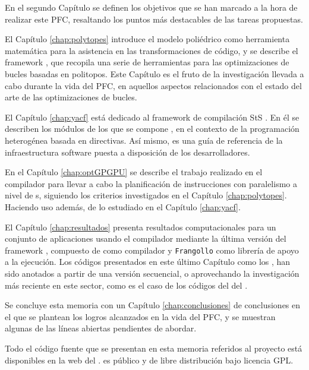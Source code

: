En el segundo Capítulo se definen los objetivos que se han marcado a la hora de realizar este \ac{PFC}, resaltando los puntos más destacables de las tareas propuestas. 

El Capítulo \ref{chap:polytopes} introduce el modelo poliédrico como herramienta 
matemática para la asistencia en las transformaciones de código,
y se describe el framework \pocc{}, que recopila una serie de herramientas para las 
optimizaciones de bucles basadas en politopos. Este Capítulo es el fruto de la 
investigación llevada a cabo durante la vida del \ac{PFC}, en aquellos aspectos  relacionados con el estado del arte de las optimizaciones de bucles.

El Capítulo \ref{chap:yacf} está dedicado al framework de compilación \acf{StS} \yacf{}. 
En él se describen los módulos de los que se compone \yacf{}, en el contexto 
de la programación heterogénea basada en directivas. Así mismo, es una guía de referencia
de la infraestructura software puesta a disposición de los desarrolladores.

En el Capítulo \ref{chap:optGPGPU} se describe el trabajo realizado en el compilador para 
llevar a cabo la planificación de instrucciones con paralelismo a nivel de \thread{}s, 
siguiendo los criterios investigados en el Capítulo \ref{chap:polytopes}. Haciendo uso 
además, de lo estudiado en el Capítulo \ref{chap:yacf}.

El Capítulo \ref{chap:resultados} presenta resultados computacionales para un 
conjunto de aplicaciones usando el compilador mediante la última versión del framework 
\accULL{}, compuesto de \yacf{} como compilador \sts{} y \texttt{Frangollo} como librería 
de apoyo a la ejecución. 
Los códigos presentados en este último Capítulo como los \rodinia{}, han sido anotados a 
partir de una versión secuencial, o aprovechando la investigación más reciente en este 
sector, como es el caso de los códigos del \benchmark{} \OpenACC{} del \epcc{} 
\cite{URL::ACCepccB}.

Se concluye esta memoria con un Capítulo \ref{chap:conclusiones} de conclusiones en el que 
se plantean los logros alcanzados en la vida del \ac{PFC}, y se muestran algunas de las 
líneas abiertas pendientes de abordar.

Todo el código fuente que se presentan en esta memoria 
referidos al proyecto \accULL{} está disponibles en la web del \gcap{} 
\cite{Web:gcap}. \accULL{} es público y de libre distribución bajo licencia 
GPL. 
